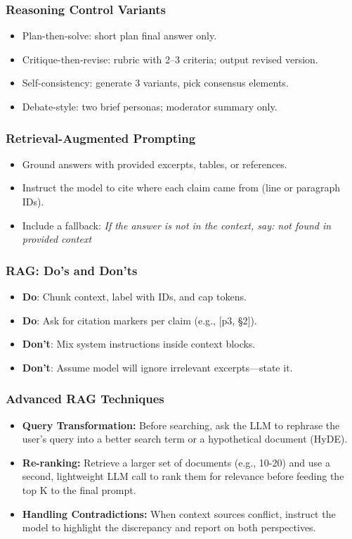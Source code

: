 \documentclass{beamer}
\begin{document}
\begin{frame}
	\frametitle{Reasoning Control Variants}
	\begin{itemize}
		\item Plan-then-solve: short plan \textrightarrow{} final answer only.
		\item Critique-then-revise: rubric with 2--3 criteria; output revised version.
		\item Self-consistency: generate 3 variants, pick consensus elements.
		\item Debate-style: two brief personas; moderator summary only.
	\end{itemize}
\end{frame}

\begin{frame}
	\frametitle{Retrieval-Augmented Prompting}
	\begin{itemize}
		\item Ground answers with provided excerpts, tables, or references.
		\item Instruct the model to cite where each claim came from (line or paragraph IDs).
	\item Include a fallback: \textit{If the answer is not in the context, say: not found in provided context}
	\end{itemize}
\end{frame}

\begin{frame}
	\frametitle{RAG: Do's and Don'ts}
	\begin{itemize}
		\item \textbf{Do}: Chunk context, label with IDs, and cap tokens.
		\item \textbf{Do}: Ask for citation markers per claim (e.g., [p3, §2]).
		\item \textbf{Don't}: Mix system instructions inside context blocks.
		\item \textbf{Don't}: Assume model will ignore irrelevant excerpts—state it.
	\end{itemize}
\end{frame}

\begin{frame}
	\frametitle{Advanced RAG Techniques}
	\begin{itemize}
		\item \textbf{Query Transformation:} Before searching, ask the LLM to rephrase the user's query into a better search term or a hypothetical document (HyDE).
		\item \textbf{Re-ranking:} Retrieve a larger set of documents (e.g., 10-20) and use a second, lightweight LLM call to rank them for relevance before feeding the top K to the final prompt.
		\item \textbf{Handling Contradictions:} When context sources conflict, instruct the model to highlight the discrepancy and report on both perspectives.
	\end{itemize}
\end{frame}
\end{document}
